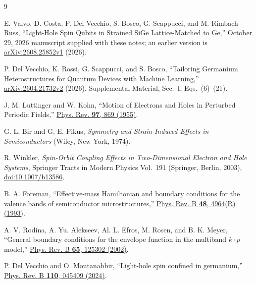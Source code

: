 \documentclass[10pt,letterpaper]{article}
\begin{document}
\clearpage
\begin{thebibliography}{9}
{}

E. Valvo, D. Costa, P. Del Vecchio, S. Bosco, G. Scappucci, and M. Rimbach-Russ,
``Light-Hole Spin Qubits in Strained SiGe Lattice-Matched to Ge,''
October 29, 2026 manuscript supplied with these notes; an earlier version is
\href{https://arxiv.org/abs/2608.25852v1}{arXiv:2608.25852v1} (2026).

P. Del Vecchio, K. Rossi, G. Scappucci, and S. Bosco,
``Tailoring Germanium Heterostructures for Quantum Devices with Machine Learning,''
\href{https://arxiv.org/abs/2604.21732v2}{arXiv:2604.21732v2} (2026),
Supplemental Material, Sec.~I, Eqs.~(6)--(21).

J. M. Luttinger and W. Kohn,
``Motion of Electrons and Holes in Perturbed Periodic Fields,''
\href{https://doi.org/10.1103/PhysRev.97.869}{Phys. Rev. \textbf{97}, 869 (1955)}.

G. L. Bir and G. E. Pikus,
\emph{Symmetry and Strain-Induced Effects in Semiconductors}
(Wiley, New York, 1974).

R. Winkler,
\emph{Spin-Orbit Coupling Effects in Two-Dimensional Electron and Hole Systems},
Springer Tracts in Modern Physics Vol.~191
(Springer, Berlin, 2003),
\href{https://doi.org/10.1007/b13586}{doi:10.1007/b13586}.

B. A. Foreman,
``Effective-mass Hamiltonian and boundary conditions for the valence bands of semiconductor microstructures,''
\href{https://doi.org/10.1103/PhysRevB.48.4964}{Phys. Rev. B \textbf{48}, 4964(R) (1993)}.

A. V. Rodina, A. Yu. Alekseev, Al. L. Efros, M. Rosen, and B. K. Meyer,
``General boundary conditions for the envelope function in the multiband $k\cdot p$ model,''
\href{https://doi.org/10.1103/PhysRevB.65.125302}{Phys. Rev. B \textbf{65}, 125302 (2002)}.

P. Del Vecchio and O. Moutanabbir,
``Light-hole spin confined in germanium,''
\href{https://doi.org/10.1103/PhysRevB.110.045409}{Phys. Rev. B \textbf{110}, 045409 (2024)}.

\end{thebibliography}
\end{document}
